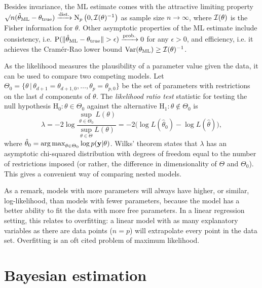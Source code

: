 Besides invariance, the ML estimate comes with the attractive limiting property $\surd{n}(\hat\theta_{\text{ML}} - \theta_{\text{true}}) \xrightarrow{\text{dist.}} \operatorname{N}_p\big(0,{\mathcal I}(\theta)^{-1}\big)$ \citep{casella2002statistical} as sample size $n\to\infty$, where ${\mathcal I}(\theta)$ is the Fisher information for $\theta$.
Other asymptotic properties of the ML estimate include consistency, i.e. $\operatorname{P}(\Vert \hat\theta_{\text{ML}} - \theta_{\text{true}}\Vert > \epsilon) \xrightarrow{\text{prob.}} 0$ for any $\epsilon>0$, and efficiency, i.e. it achieves the Cramér-Rao lower bound $\operatorname{Var}(\theta_{\text{ML}}) \geq {\mathcal I}(\theta)^{-1}$.

As the likelihood measures the plausibility of a parameter value given the data, it can be used to compare two competing models.
Let $\Theta_0 = \{\theta \,|\, \theta_{d+1} = \theta_{d+1,0},\dots,\theta_{p} = \theta_{p,0} \}$ be the set of parameters with restrictions on the last $d$ components of $\theta$.
The \emph{likelihood ratio test} statistic for testing the null hypothesis $\text{H}_0: \theta \in \Theta_0$ against the alternative $\text{H}_1: \theta \notin \Theta_0$ is
\begin{equation}
  \lambda = -2 \log \frac{\sup_{\theta \in \Theta_0} L(\theta)}{\sup_{\theta \in \Theta} L(\theta)} = -2 \big( \log L(\hat\theta_0) - \log L(\hat\theta) \big),
\end{equation}
where $\hat\theta_0 = \operatorname*{arg\,max}_{\theta \in \Theta_0} \log p({\mathbf y}|\theta)$.
Wilks' theorem states that $\lambda$ has an asymptotic chi-squared distribution with degrees of freedom equal to the number of restrictions  imposed (or rather, the difference in dimensionality of $\Theta$ and $\Theta_0$).
This gives a convenient way of comparing nested models. 

As a remark, models with more parameters will always have higher, or similar, log-likelihood, than models with fewer parameters, because the model has a better ability to fit the data with more free parameters.
In a linear regression setting, this relates to overfitting: a linear model with as many explanatory variables as there are data points ($n=p$) will extrapolate every point in the data set.
Overfitting is an oft cited problem of maximum likelihood.

\section{Bayesian estimation}

